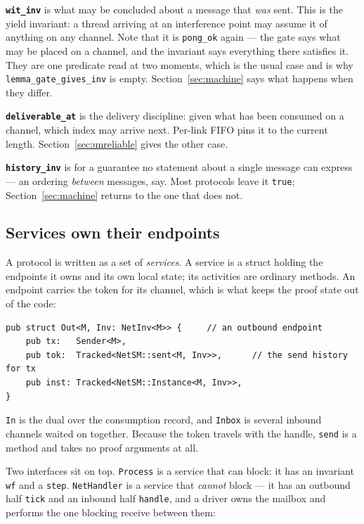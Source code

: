\documentclass[11pt]{article}
\newcommand{\code}[1]{\texttt{#1}}
\newcommand{\srcname}[1]{%
  \vspace{0.9em}\noindent{\sffamily\scriptsize\color{comment}\MakeUppercase{#1}}\par
  \vspace{-0.7em}}
\begin{document}
\textbf{\code{wit\_inv}} is what may be concluded about a message that
\emph{was} sent. This is the yield invariant: a thread arriving at an
interference point may assume it of anything on any channel. Note that it is
\code{pong\_ok} again --- the gate says what may be placed on a channel, and the
invariant says everything there satisfies it. They are one predicate read at two
moments, which is the usual case and is why
\code{lemma\_gate\_gives\_inv} is empty. Section~\ref{sec:machine} says what
happens when they differ.

\textbf{\code{deliverable\_at}} is the delivery discipline: given what has been
consumed on a channel, which index may arrive next. Per-link FIFO pins it to the
current length. Section~\ref{sec:unreliable} gives the other case.

\textbf{\code{history\_inv}} is for a guarantee no statement about a single message can
express --- an ordering \emph{between} messages, say. Most protocols leave it
\code{true}; Section~\ref{sec:machine} returns to the one that does not.

\subsection*{Services own their endpoints}

A protocol is written as a set of \emph{services}. A service is a struct holding
the endpoints it owns and its own local state; its activities are ordinary
methods. An endpoint carries the token for its channel, which is what keeps the
proof state out of the code:

\srcname{src/proc.rs}
\begin{lstlisting}
pub struct Out<M, Inv: NetInv<M>> {     // an outbound endpoint
    pub tx:   Sender<M>,
    pub tok:  Tracked<NetSM::sent<M, Inv>>,      // the send history for tx
    pub inst: Tracked<NetSM::Instance<M, Inv>>,
}
\end{lstlisting}

\code{In} is the dual over the consumption record, and \code{Inbox} is several
inbound channels waited on together. Because the token travels with the handle,
\code{send} is a method and takes no proof arguments at all.

Two interfaces sit on top. \code{Process} is a service that can block: it has an
invariant \code{wf} and a \code{step}. \code{NetHandler} is a service that
\emph{cannot} block --- it has an outbound half \code{tick} and an inbound half
\code{handle}, and a driver owns the mailbox and performs the one blocking
receive between them:
\end{document}
